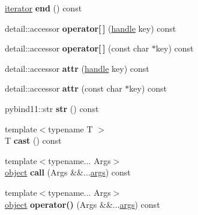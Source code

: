 \begin{DoxyCompactItemize}
\item 
\hyperlink{classiterator}{iterator} {\bfseries end} () const \hypertarget{classhandle_ae737e26b857141303bc80ad16e2802c6}{}\label{classhandle_ae737e26b857141303bc80ad16e2802c6}

\item 
detail\+::accessor {\bfseries operator\mbox{[}$\,$\mbox{]}} (\hyperlink{classhandle}{handle} key) const \hypertarget{classhandle_abecec1794eb38ba3e7223e29f3506650}{}\label{classhandle_abecec1794eb38ba3e7223e29f3506650}

\item 
detail\+::accessor {\bfseries operator\mbox{[}$\,$\mbox{]}} (const char $\ast$key) const \hypertarget{classhandle_ae51499a4548bd5a2b3d0e17c9aee5da6}{}\label{classhandle_ae51499a4548bd5a2b3d0e17c9aee5da6}

\item 
detail\+::accessor {\bfseries attr} (\hyperlink{classhandle}{handle} key) const \hypertarget{classhandle_a6e8d2eafc3c046c99783d5d44f4065d1}{}\label{classhandle_a6e8d2eafc3c046c99783d5d44f4065d1}

\item 
detail\+::accessor {\bfseries attr} (const char $\ast$key) const \hypertarget{classhandle_a35c8bdb8af240e9c474a23fba448ab32}{}\label{classhandle_a35c8bdb8af240e9c474a23fba448ab32}

\item 
pybind11\+::str {\bfseries str} () const \hypertarget{classhandle_ae83ad7d05fc4d174b70d8a7c3d55b5c8}{}\label{classhandle_ae83ad7d05fc4d174b70d8a7c3d55b5c8}

\item 
{\footnotesize template$<$typename T $>$ }\\T {\bfseries cast} () const \hypertarget{classhandle_a89810affcf6ddff3b32fca4659f25b3e}{}\label{classhandle_a89810affcf6ddff3b32fca4659f25b3e}

\item 
{\footnotesize template$<$typename... Args$>$ }\\\hyperlink{classobject}{object} {\bfseries call} (Args \&\&...\hyperlink{classargs}{args}) const \hypertarget{classhandle_a4b736074376e80dd90fcc028ac1a8499}{}\label{classhandle_a4b736074376e80dd90fcc028ac1a8499}

\item 
{\footnotesize template$<$typename... Args$>$ }\\\hyperlink{classobject}{object} {\bfseries operator()} (Args \&\&...\hyperlink{classargs}{args}) const \hypertarget{classhandle_a35735ebc9929a4d41228af4489344ae0}{}\label{classhandle_a35735ebc9929a4d41228af4489344ae0}


\end{DoxyCompactItemize}
